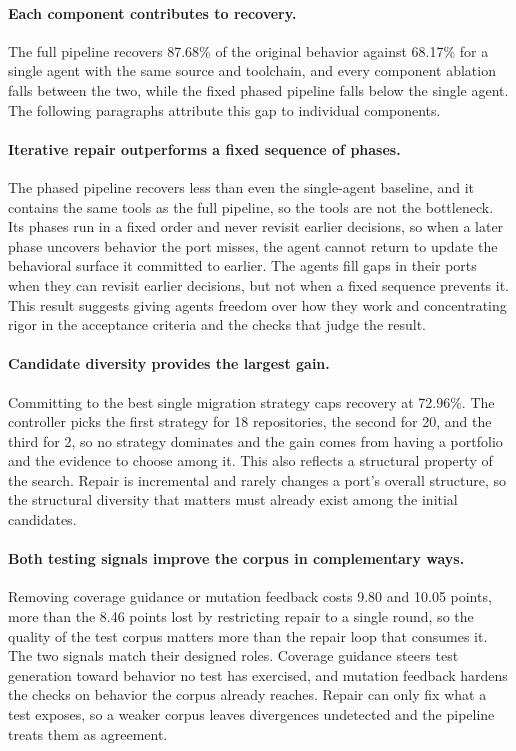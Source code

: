 \paragraph{Each component contributes to recovery.}
The full pipeline recovers 87.68\% of the original behavior against 68.17\% for a single agent with the same source and toolchain, and every component ablation falls between the two, while the fixed phased pipeline falls below the single agent.
The following paragraphs attribute this gap to individual components.

\paragraph{Iterative repair outperforms a fixed sequence of phases.}
The phased pipeline recovers less than even the single-agent baseline, and it contains the same tools as the full pipeline, so the tools are not the bottleneck.
Its phases run in a fixed order and never revisit earlier decisions, so when a later phase uncovers behavior the port misses, the agent cannot return to update the behavioral surface it committed to earlier.
The agents fill gaps in their ports when they can revisit earlier decisions, but not when a fixed sequence prevents it.
This result suggests giving agents freedom over how they work and concentrating rigor in the acceptance criteria and the checks that judge the result.

\paragraph{Candidate diversity provides the largest gain.}
Committing to the best single migration strategy caps recovery at 72.96\%.
The controller picks the first strategy for 18 repositories, the second for 20, and the third for 2, so no strategy dominates and the gain comes from having a portfolio and the evidence to choose among it.
This also reflects a structural property of the search.
Repair is incremental and rarely changes a port's overall structure, so the structural diversity that matters must already exist among the initial candidates.

\paragraph{Both testing signals improve the corpus in complementary ways.}
Removing coverage guidance or mutation feedback costs 9.80 and 10.05 points, more than the 8.46 points lost by restricting repair to a single round, so the quality of the test corpus matters more than the repair loop that consumes it.
The two signals match their designed roles.
Coverage guidance steers test generation toward behavior no test has exercised, and mutation feedback hardens the checks on behavior the corpus already reaches.
Repair can only fix what a test exposes, so a weaker corpus leaves divergences undetected and the pipeline treats them as agreement.

